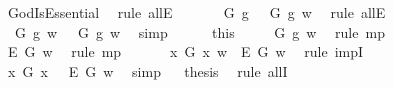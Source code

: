 \begin{isabellebody}
\ GodIsEssential\ \isamarkupfalse%
\ {\isacharparenleft}rule\ allE{\isacharparenright}\isanewline
\ \ \ \ \isamarkupfalse%
\ \ {\isachardoublequoteopen}{\isacharparenleft}G\ g\ \isactrlbold {\isasymrightarrow}\ {\isacharparenleft}{\isacharparenleft}{\isasymE}\ {\isasymdown}G{\isacharparenright}\ g{\isacharparenright}{\isacharparenright}\ w{\isachardoublequoteclose}\ \isamarkupfalse%
\ {\isacharparenleft}rule\ allE{\isacharparenright}\isanewline
\ \ \ \ \isamarkupfalse%
\ \ {\isachardoublequoteopen}G\ g\ w\ {\isasymlongrightarrow}\ {\isacharparenleft}{\isasymE}\ {\isasymdown}G{\isacharparenright}\ g\ w{\isachardoublequoteclose}\ \isamarkupfalse%
\ simp\isanewline
\ \ \ \ \isamarkupfalse%
\ this\ {}\ \isamarkupfalse%
\ {}{\isacharcolon}\ {\isachardoublequoteopen}{\isacharparenleft}{\isasymE}\ {\isasymdown}G{\isacharparenright}\ g\ w{\isachardoublequoteclose}\ \isamarkupfalse%
\ {\isacharparenleft}rule\ mp{\isacharparenright}\isanewline
\ \ \ \ \isamarkupfalse%
\ {}\ {}\ \isamarkupfalse%
\ {\isachardoublequoteopen}{\isacharparenleft}\isactrlbold {\isasymbox}\isactrlbold {\isasymexists}\isactrlsup E\ G{\isacharparenright}\ w{\isachardoublequoteclose}\ \isamarkupfalse%
\ {\isacharparenleft}rule\ mp{\isacharparenright}\isanewline
\ \ \isacommand{{\isacharbraceright}}\isamarkupfalse%
\isanewline
\ \ \isamarkupfalse%
\ {\isachardoublequoteopen}{\isacharparenleft}{\isasymexists}x{\isachardot}\ G\ x\ w{\isacharparenright}\ {\isasymlongrightarrow}\ {\isacharparenleft}\isactrlbold {\isasymbox}\isactrlbold {\isasymexists}\isactrlsup E\ G{\isacharparenright}\ w{\isachardoublequoteclose}\ \isamarkupfalse%
\ {\isacharparenleft}rule\ impI{\isacharparenright}\isanewline
\ \ \isamarkupfalse%
\ {\isachardoublequoteopen}{\isacharparenleft}{\isacharparenleft}\isactrlbold {\isasymexists}x{\isachardot}\ G\ x{\isacharparenright}\ \isactrlbold {\isasymrightarrow}\ \ \isactrlbold {\isasymbox}\isactrlbold {\isasymexists}\isactrlsup E\ G{\isacharparenright}\ w{\isachardoublequoteclose}\ \isamarkupfalse%
\ simp\isanewline
\isacommand{{\isacharbraceright}}\isamarkupfalse%
\isanewline
\ \isamarkupfalse%
\ {\isacharquery}thesis\ \isamarkupfalse%
\ {\isacharparenleft}rule\ allI{\isacharparenright}\ \isanewline

\end{isabellebody}
